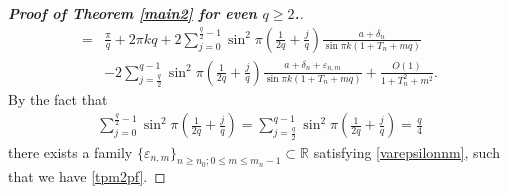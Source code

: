 \documentclass[12pt]{amsart}
\theoremstyle{plain}
\newcommand{\R}{\mathbb{R}}
\theoremstyle{definition}
\begin{document}
\begin{proof}[\textbf{Proof of Theorem \ref{main2} for even $q\geq2$.}]
\begin{align}
=&\frac{\pi}{q}+2\pi kq+2\sum_{j=0}^{\frac{q}{2}-1}\sin^2\pi\left(\frac{1}{2q}+\frac{j}{q}\right)\frac{a+\delta_n}{\sin\pi k(1+T_n+mq)}\nonumber\\
&-2\sum_{j=\frac{q}{2}}^{q-1}\sin^2\pi\left(\frac{1}{2q}+\frac{j}{q}\right)\frac{a+\delta_n+\varepsilon_{n,m}}{\sin\pi k(1+T_n+mq)}+\frac{O(1)}{1+T_n^2+m^2}.\nonumber
\end{align}
By the fact that
%		
		\begin{align}
			\sum_{j=0}^{\frac{q}{2}-1}\sin^2\pi\left(\frac{1}{2q}+\frac{j}{q}\right)=\sum_{j=\frac{q}{2}}^{q-1}\sin^2\pi\left(\frac{1}{2q}+\frac{j}{q}\right)=\frac{q}{4}\nonumber
		\end{align}
there exists a family $\{\varepsilon_{n,m}\}_{n\geq n_0;0\leq m\leq m_n-1}\subset\R$ satisfying \eqref{varepsilonnm}, such that we have \eqref{tpm2pf}.  


\end{proof}
\end{document}
